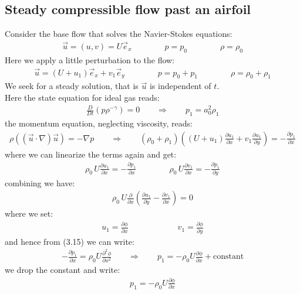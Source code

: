 \documentclass[11pt]{book}
\theoremstyle{break}
\theoremstyle{break}
\begin{document}
\subsection{Steady compressible flow past an airfoil}
Consider the base flow that solves the Navier-Stokes equations: 
\begin{align*}
\vec{u} =(u,v)= U \vec{e}_x \qquad\qquad p=p_0 \qquad\qquad\rho = \rho_0
\end{align*}
Here we apply a little perturbation to the flow:
\begin{align*}
\vec{u} = (U+u_1) \vec{e}_x+v_1\vec{e}_y \qquad\qquad p=p_0+p_1 \qquad\qquad\rho = \rho_0+\rho_1
\end{align*}
We seek for a steady solution, that is $\vec{u}$ is independent of $t$.\\
Here the state equation for ideal gas reads:
\begin{align}
\frac{D}{Dt}( p \rho^{-\gamma}) = 0 \qquad\Rightarrow\qquad p_1 = a_0^2\rho_1
\end{align}
the momentum equation, neglecting viscosity, reads:
\begin{align*}
\rho((\vec{u}\cdot \nabla)\vec{u}) = -\nabla p \qquad \Rightarrow \qquad (\rho_0+\rho_1) \left( (U+u_1)\frac{\partial u_1}{\partial x} + v_1 \frac{\partial u_1}{\partial y}\right) = -\frac{\partial p_1}{\partial x}
\end{align*}
where we can linearize the terms again and get:
\begin{align}
\rho_0 \, U \frac{\partial u_1}{\partial x} = -\frac{\partial p_1}{\partial x} \qquad\qquad \rho_0\, U\frac{\partial v_1}{\partial x} = -\frac{\partial p_1}{\partial y}
\end{align}
combining we have:
\begin{align*}
\rho_0\, U \frac{\partial }{\partial x}\left( \frac{\partial u_1}{\partial y} - \frac{\partial v_1}{\partial x}\right) = 0
\end{align*}
where we set:
\begin{align*}
u_1 = \frac{\partial \phi}{\partial x}\qquad\qquad\qquad v_1 = \frac{\partial \phi}{\partial y}
\end{align*}
and hence from (3.15) we can write:
\begin{align*}
-\frac{\partial p_1}{\partial x} = \rho_0 U \frac{\partial^2 \phi}{\partial x^2}
\qquad\Rightarrow\qquad
p_1 = -\rho_0 U \frac{\partial \phi}{\partial x}+\text{constant}
\end{align*}
we drop the constant and write:
\begin{align}
p_1 = -\rho_0 U \frac{\partial \phi}{\partial x}
\end{align}
\end{document}
